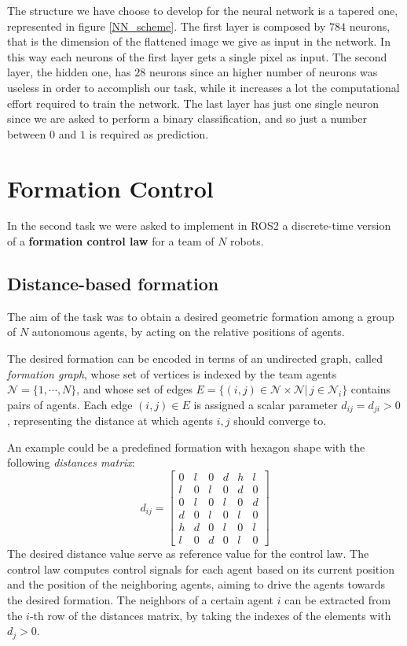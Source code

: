\documentclass[a4paper,11pt,oneside]{book}
\begin{document}
The structure we have choose to develop for the neural network is a tapered one, represented in figure \ref{NN_scheme}. 
The first layer is composed by $784$ neurons, that is the dimension of the flattened image we give as input in the network. In this way each neurons of the first layer gets a single pixel as input. The second layer, the hidden one, has $28$ neurons since an higher number of neurons was useless in order to accomplish our task, while it increases a lot the computational effort required to train the network. The last layer has just one single neuron since we are asked to perform a binary classification, and so just a number between $0$ and $1$ is required as prediction.







\chapter{Formation Control} 
 In the second task we were asked to implement in ROS2 a discrete-time version of a \textbf{formation control law} for a team of $N$ robots.

\section{Distance-based formation}
The aim of the task was to obtain a desired geometric formation among a group of $N$ autonomous agents, by acting on the relative positions of agents.

\bigskip
The desired formation can be encoded in terms of an undirected graph, called \textit{formation graph}, whose set of vertices is indexed by the team agents $\mathcal{N} =\{ 1, \cdots, N\}$, and whose set of edges $E=\{(i,j) \in \mathcal{N} \times \mathcal{N} | \, j \in \mathcal{N}_i\}$ contains pairs of agents. Each edge $(i,j) \in E$ is assigned a scalar parameter $d_{ij} = d_{ji} > 0$, representing the distance at which agents $i,j$ should converge to. 

An example could be a predefined formation with hexagon shape with the following \textit{distances matrix}:
\begin{equation}
d_{ij} =
\begin{bmatrix}
0 & l & 0 & d & h & l \\
l & 0 & l & 0 & d & 0 \\
0 & l & 0 & l & 0 & d \\
d & 0 & l & 0 & l & 0 \\
h & d & 0 & l & 0 & l \\
l & 0 & d & 0 & l & 0
\end{bmatrix}
\end{equation}
The desired distance value serve as reference value for the control law. The control law computes control signals for each agent based on its current position and the position of the neighboring agents, aiming to drive the agents towards the desired formation.
The neighbors of a certain agent $i$ can be extracted from the $i$-th row of the distances matrix, by taking the indexes of the elements with $d_j > 0$.
\end{document}
